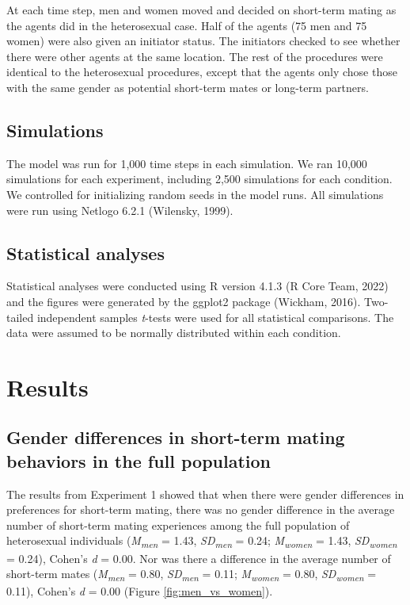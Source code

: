 \documentclass[
  11pt,
]{article}
\begin{document}
At each time step, men and women moved and decided on short-term mating
as the agents did in the heterosexual case. Half of the agents (75 men
and 75 women) were also given an initiator status. The initiators
checked to see whether there were other agents at the same location. The
rest of the procedures were identical to the heterosexual procedures,
except that the agents only chose those with the same gender as
potential short-term mates or long-term partners.

\hypertarget{simulations}{%
\subsection{Simulations}\label{simulations}}

The model was run for 1,000 time steps in each simulation. We ran 10,000
simulations for each experiment, including 2,500 simulations for each
condition. We controlled for initializing random seeds in the model
runs. All simulations were run using Netlogo 6.2.1 (Wilensky, 1999).

\hypertarget{statistical-analyses}{%
\subsection{Statistical analyses}\label{statistical-analyses}}

Statistical analyses were conducted using R version 4.1.3 (R Core Team,
2022) and the figures were generated by the ggplot2 package (Wickham,
2016). Two-tailed independent samples \emph{t}-tests were used for all
statistical comparisons. The data were assumed to be normally
distributed within each condition.

\hypertarget{results}{%
\section{Results}\label{results}}

\hypertarget{gender-differences-in-short-term-mating-behaviors-in-the-full-population}{%
\subsection{Gender differences in short-term mating behaviors in the
full
population}\label{gender-differences-in-short-term-mating-behaviors-in-the-full-population}}

The results from Experiment 1 showed that when there were gender
differences in preferences for short-term mating, there was no gender
difference in the average number of short-term mating experiences among
the full population of heterosexual individuals
(\emph{M\textsubscript{men}} = 1.43, \emph{SD\textsubscript{men}} =
0.24; \emph{M\textsubscript{women}} = 1.43,
\emph{SD\textsubscript{women}} = 0.24), Cohen's \emph{d} = 0.00. Nor was
there a difference in the average number of short-term mates
(\emph{M\textsubscript{men}} = 0.80, \emph{SD\textsubscript{men}} =
0.11; \emph{M\textsubscript{women}} = 0.80,
\emph{SD\textsubscript{women}} = 0.11), Cohen's \emph{d} = 0.00 (Figure
\ref{fig:men_vs_women}).
\end{document}

